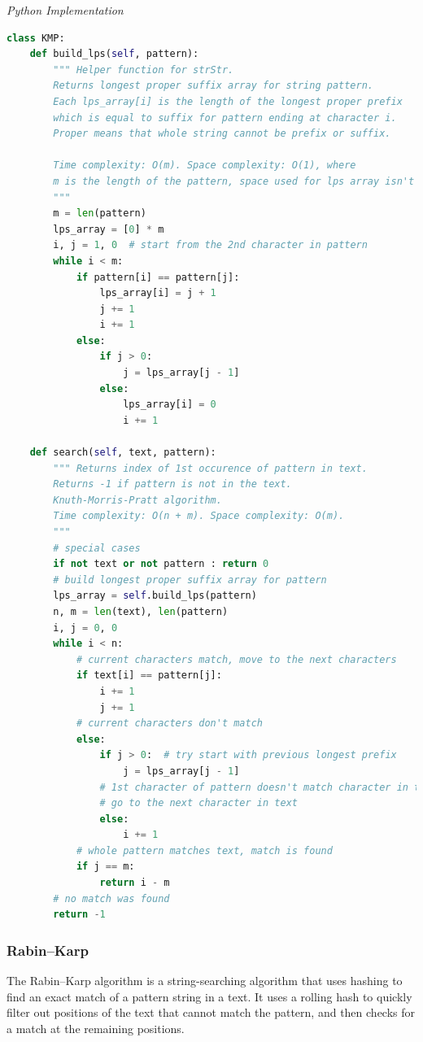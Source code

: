 \documentclass{article}
\begin{document}
\vspace{8pt} \emph{Python Implementation}
\begin{lstlisting}[language=Python]    
class KMP:
    def build_lps(self, pattern):
        """ Helper function for strStr.
        Returns longest proper suffix array for string pattern.
        Each lps_array[i] is the length of the longest proper prefix
        which is equal to suffix for pattern ending at character i.
        Proper means that whole string cannot be prefix or suffix.

        Time complexity: O(m). Space complexity: O(1), where
        m is the length of the pattern, space used for lps array isn't included.
        """
        m = len(pattern)
        lps_array = [0] * m
        i, j = 1, 0  # start from the 2nd character in pattern
        while i < m:
            if pattern[i] == pattern[j]:
                lps_array[i] = j + 1
                j += 1
                i += 1
            else:
                if j > 0:
                    j = lps_array[j - 1]
                else:
                    lps_array[i] = 0
                    i += 1
        
    def search(self, text, pattern):
        """ Returns index of 1st occurence of pattern in text.
        Returns -1 if pattern is not in the text.
        Knuth-Morris-Pratt algorithm.
        Time complexity: O(n + m). Space complexity: O(m).
        """
        # special cases
        if not text or not pattern : return 0
        # build longest proper suffix array for pattern
        lps_array = self.build_lps(pattern)
        n, m = len(text), len(pattern)
        i, j = 0, 0
        while i < n:
            # current characters match, move to the next characters
            if text[i] == pattern[j]:
                i += 1
                j += 1
            # current characters don't match
            else:
                if j > 0:  # try start with previous longest prefix
                    j = lps_array[j - 1]
                # 1st character of pattern doesn't match character in text
                # go to the next character in text
                else:
                    i += 1
            # whole pattern matches text, match is found
            if j == m:
                return i - m
        # no match was found
        return -1
\end{lstlisting}
    
    \subsubsection{Rabin–Karp}
    The Rabin–Karp algorithm is a string-searching algorithm that uses hashing to find an exact match of a pattern string in a text. It uses a rolling hash to quickly filter out positions of the text that cannot match the pattern, and then checks for a match at the remaining positions.
\end{document}

